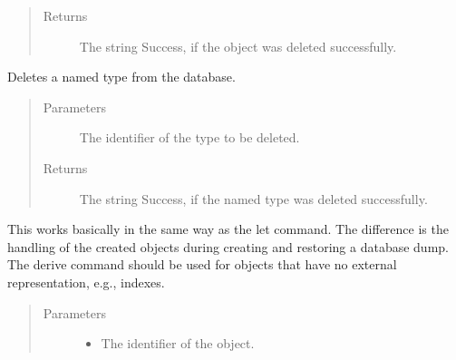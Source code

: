 \documentclass[letterpaper,10pt,english]{sphinxmanual}
\begin{document}
\begin{fulllineitems}
\begin{fulllineitems}
\begin{quote}
\begin{description}
\item[{Returns}] \leavevmode
The string Success, if the object was deleted successfully.

\end{description}\end{quote}

\end{fulllineitems}


\begin{fulllineitems}
\label{\detokenize{index:secondodb.api.secondoapi.Cursor.execute_delete_type}}
Deletes a named type from the database.
\begin{quote}\begin{description}
\item[{Parameters}] \leavevmode
{} \textendash{} The identifier of the type to be deleted.

\item[{Returns}] \leavevmode
The string Success, if the named type was deleted successfully.

\end{description}\end{quote}

\end{fulllineitems}


\begin{fulllineitems}
\label{\detokenize{index:secondodb.api.secondoapi.Cursor.execute_derive}}
This works basically in the same way as the let command. The difference is the handling of the created objects
during creating and restoring a database dump. The derive command should be used for objects that have no
external representation, e.g., indexes.
\begin{quote}\begin{description}
\item[{Parameters}] \leavevmode\begin{itemize}
\item {} 
 \textendash{} The identifier of the object.


\end{itemize}
\end{description}
\end{quote}
\end{fulllineitems}
\end{fulllineitems}
\end{document}

